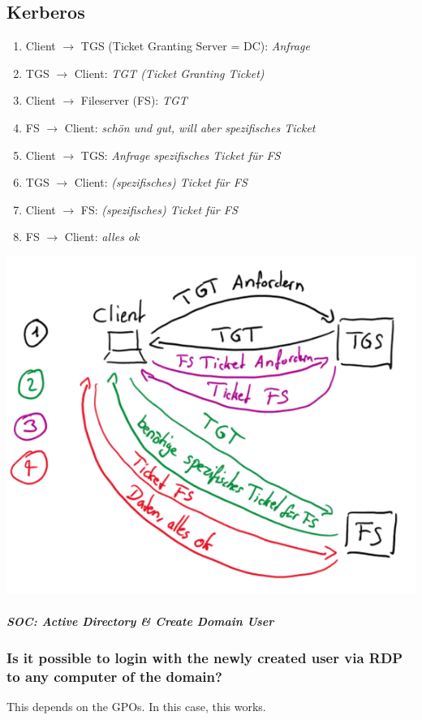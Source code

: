 \newpage

\subsection{Kerberos}
\begin{enumerate}
    \item Client $\rightarrow$ TGS (Ticket Granting Server = DC): \textit{Anfrage}
    \item TGS $\rightarrow$ Client: \textit{TGT (Ticket Granting Ticket)}
    \item Client $\rightarrow$ Fileserver (FS): \textit{TGT}
    \item FS $\rightarrow$ Client: \textit{schön und gut, will aber spezifisches Ticket}
    \item Client $\rightarrow$ TGS: \textit{Anfrage spezifisches Ticket für FS}
    \item TGS $\rightarrow$ Client: \textit{(spezifisches) Ticket für FS}
    \item Client $\rightarrow$ FS: \textit{(spezifisches) Ticket für FS}
    \item FS $\rightarrow$ Client: \textit{alles ok}
\end{enumerate}
\begin{center}
    \includegraphics[width=0.9\linewidth]{./img/03-active_directory/kerberos}
    \vspace{-8pt}
\end{center}

\subparagraph{SOC: Active Directory \& Create Domain User}
\subsubsection{Is it possible to login with the newly created user via RDP to any computer of the domain?}
This depends on the GPOs. In this case, this works.

